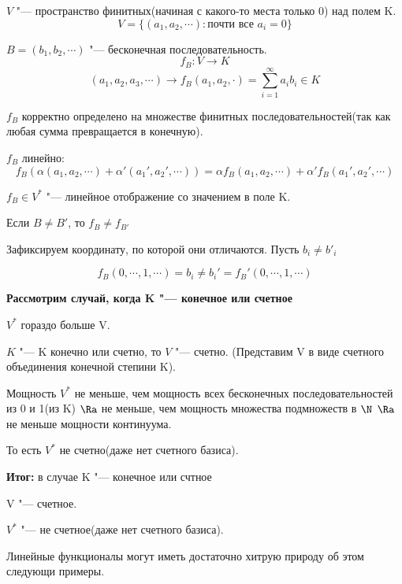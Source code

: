 \begin{exmp}
$V$ "--- пространство финитных(начиная с какого-то места только 0) над
полем K.
$$V = \{(a_1, a_2, \cdots) \colon \text{почти все } a_i = 0\}$$

$B = (b_1, b_2, \cdots)$ "--- бесконечная последовательность.
$$f_B\colon V \to K$$
$$(a_1, a_2, a_3, \cdots) \to f_B(a_1, a_2, \cdot) = \sum_{i = 1}^{\infty}a_ib_i \in K$$

$f_B$ корректно определено на множестве финитных последовательностей(так как любая сумма превращается
в конечную).

$f_B$ линейно:
$$f_B(\alpha(a_1, a_2, \cdots) + \alpha'(a_1', a_2', \cdots)) = 
\alpha f_{B}(a_1, a_2, \cdots) + \alpha' f_B(a_1', a_2', \cdots)$$

$f_B \in V^{*}$ "--- линейное отображение со значением в поле K.

Если $B \ne B'$, то $f_B \ne f_{B'}$

Зафиксируем координату, по которой они отличаются. Пусть $b_i \ne b'_i$

$$f_B(0, \cdots, 1, \cdots) = b_i \ne b_i' = f_B'(0, \cdots, 1, \cdots)$$
\end{exmp}

\textbf{Рассмотрим случай, когда K "--- конечное или счетное}

$V^*$ гораздо больше V.

$K$ "--- K конечно или счетно, то $V$ "--- счетно.  (Представим
V в виде счетного объединения конечной степини K).

Мощность $V^{*}$ не меньше, чем мощность всех
бесконечных последовательностей из 0 и 1(из K)
$\Ra$ не меньше, чем мощность множества подмножеств в $\N$ 
$\Ra$ не меньше мощности континуума.

То есть $V^*$ не счетно(даже нет счетного базиса).

\textbf{Итог:} в случае K "--- конечное или счтное

V "--- счетное.

$V^*$ "--- не счетное(даже нет счетного базиса).


Линейные функционалы могут иметь достаточно хитрую природу
об этом следующи примеры.

